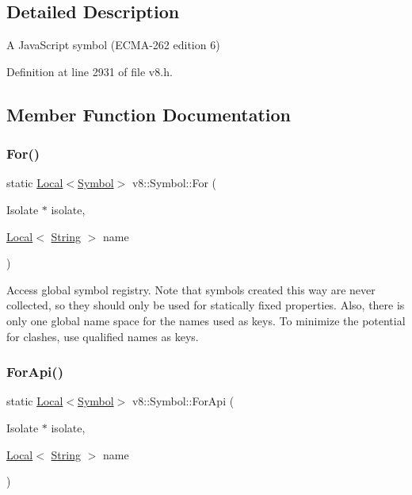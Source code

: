\subsection{Detailed Description}
A Java\+Script symbol (E\+C\+M\+A-\/262 edition 6) 

Definition at line 2931 of file v8.\+h.



\subsection{Member Function Documentation}
\mbox{\label{classv8_1_1Symbol_a8a4a6bdc7d3e31c71cf48fa5cb811fc8}} 
\subsubsection{\texorpdfstring{For()}{For()}}
{\footnotesize\ttfamily static \mbox{\hyperlink{classv8_1_1Local}{Local}}$<$\mbox{\hyperlink{classv8_1_1Symbol}{Symbol}}$>$ v8\+::\+Symbol\+::\+For (\begin{DoxyParamCaption}\item[{Isolate $\ast$}]{isolate,  }\item[{\mbox{\hyperlink{classv8_1_1Local}{Local}}$<$ \mbox{\hyperlink{classv8_1_1String}{String}} $>$}]{name }\end{DoxyParamCaption})\hspace{0.3cm}{\ttfamily [static]}}

Access global symbol registry. Note that symbols created this way are never collected, so they should only be used for statically fixed properties. Also, there is only one global name space for the names used as keys. To minimize the potential for clashes, use qualified names as keys. \mbox{\label{classv8_1_1Symbol_ac3937f0b0b831c4be495a399f26d7301}} 
\subsubsection{\texorpdfstring{For\+Api()}{ForApi()}}
{\footnotesize\ttfamily static \mbox{\hyperlink{classv8_1_1Local}{Local}}$<$\mbox{\hyperlink{classv8_1_1Symbol}{Symbol}}$>$ v8\+::\+Symbol\+::\+For\+Api (\begin{DoxyParamCaption}\item[{Isolate $\ast$}]{isolate,  }\item[{\mbox{\hyperlink{classv8_1_1Local}{Local}}$<$ \mbox{\hyperlink{classv8_1_1String}{String}} $>$}]{name }\end{DoxyParamCaption})\hspace{0.3cm}{\ttfamily [static]}}

